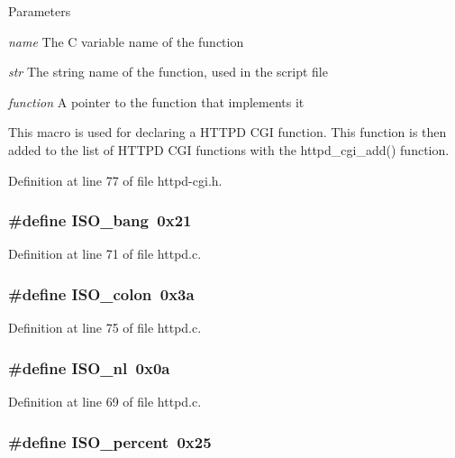 \begin{DoxyParams}{Parameters}
\item[{\em name}]The C variable name of the function \item[{\em str}]The string name of the function, used in the script file \item[{\em function}]A pointer to the function that implements it\end{DoxyParams}
This macro is used for declaring a HTTPD CGI function. This function is then added to the list of HTTPD CGI functions with the httpd\_\-cgi\_\-add() function. 

Definition at line 77 of file httpd-\/cgi.h.

\hypertarget{group__httpd_gae3f8f7deae69854853b0c8ebb82c380d}{
\subsubsection[{ISO\_\-bang}]{\setlength{\rightskip}{0pt plus 5cm}\#define ISO\_\-bang~0x21}}
\label{group__httpd_gae3f8f7deae69854853b0c8ebb82c380d}


Definition at line 71 of file httpd.c.

\hypertarget{group__httpd_ga14e276fa8e765f774f4162619f1c8fc1}{
\subsubsection[{ISO\_\-colon}]{\setlength{\rightskip}{0pt plus 5cm}\#define ISO\_\-colon~0x3a}}
\label{group__httpd_ga14e276fa8e765f774f4162619f1c8fc1}


Definition at line 75 of file httpd.c.

\hypertarget{group__httpd_ga3212e70c55244608ac16316888c354f0}{
\subsubsection[{ISO\_\-nl}]{\setlength{\rightskip}{0pt plus 5cm}\#define ISO\_\-nl~0x0a}}
\label{group__httpd_ga3212e70c55244608ac16316888c354f0}


Definition at line 69 of file httpd.c.

\hypertarget{group__httpd_ga79f9a50c2cccb967d38a2eeb45d2fd75}{
\subsubsection[{ISO\_\-percent}]{\setlength{\rightskip}{0pt plus 5cm}\#define ISO\_\-percent~0x25}}
\label{group__httpd_ga79f9a50c2cccb967d38a2eeb45d2fd75}


